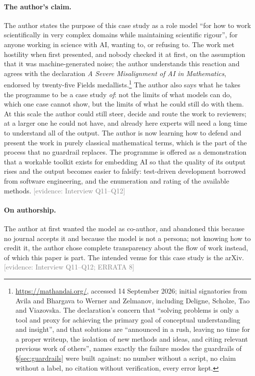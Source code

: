 \documentclass[11pt,a4paper]{article}
\newcommand{\evidence}[1]{{\footnotesize\textcolor{Gray}{[evidence: #1]}}}
\begin{document}
\paragraph{The author's claim.} The author states the purpose of this case study as a role model ``for how to work
scientifically in very complex domains while maintaining scientific rigour'', for anyone working in science with AI,
wanting to, or refusing to. The work met hostility when first presented, and nobody checked it at first, on the
assumption that it was machine-generated noise; the author understands this reaction and agrees with the
declaration \emph{A Severe Misalignment of AI in Mathematics}, endorsed by twenty-five Fields medallists.\footnote{
\url{https://mathandai.org/}, accessed 14 September 2026; initial signatories from Avila and Bhargava to Werner and
Zelmanov, including Deligne, Scholze, Tao and Viazovska. The declaration's concern that ``solving problems is only a
tool and proxy for achieving the primary goal of conceptual understanding and insight'', and that solutions are
``announced in a rush, leaving no time for a proper writeup, the isolation of new methods and ideas, and citing
relevant previous work of others'', names exactly the failure modes the guardrails of \S\ref{sec:guardrails} were built
against: no number without a script, no claim without a label, no citation without verification, every error kept.}
The author also says what he takes the programme to be a case study \emph{of}: not the limits of what models can
do, which one case cannot show, but the limits of what he could still do with them. At this scale the author could
still steer, decide and route the work to reviewers; at a larger one he could not have, and already here experts
will need a long time to understand all of the output. The author is now learning how to defend and present the
work in purely classical mathematical terms, which is the part of the process that no guardrail replaces.
The programme is offered as a demonstration that a workable toolkit exists for embedding AI so that
the quality of its output rises and the output becomes easier to falsify: test-driven development borrowed from
software engineering, and the enumeration and rating of the available methods. \evidence{Interview Q11--Q12}

\paragraph{On authorship.} The author at first wanted the model as co-author, and abandoned this because no journal
accepts it and because the model is not a persona; not knowing how to credit it, the author chose complete
transparency about the flow of work instead, of which this paper is part. The intended venue for this case study
is the arXiv. \evidence{Interview Q11--Q12; ERRATA 8}
\end{document}
